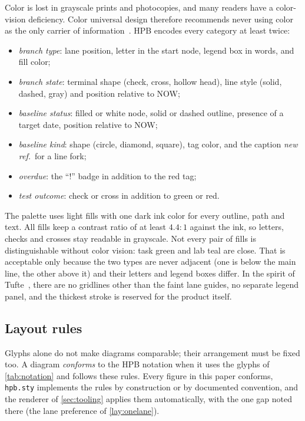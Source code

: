 Color is lost in grayscale prints and photocopies, and many readers have
a color-vision deficiency. Color universal design therefore recommends
never using color as the only carrier of
information~\citep{okabe2008cud}. HPB encodes every category at least
twice:
\begin{itemize}[leftmargin=1.5em,itemsep=1pt,topsep=3pt]
  \item \emph{branch type}: lane position, letter in the start node, legend
        box in words, and fill color;
  \item \emph{branch state}: terminal shape (check, cross, hollow head),
        line style (solid, dashed, gray) and position relative to NOW;
  \item \emph{baseline status}: filled or white node, solid or dashed
        outline, presence of a target date, position relative to NOW;
  \item \emph{baseline kind}: shape (circle, diamond, square), tag color,
        and the caption \emph{new ref.}\ for a line fork;
  \item \emph{overdue}: the ``!'' badge in addition to the red tag;
  \item \emph{test outcome}: check or cross in addition to green or red.
\end{itemize}
The palette uses light fills with one dark ink color for every outline,
path and text. All fills keep a contrast ratio of at least $4.4{:}1$
against the ink, so letters, checks and crosses stay readable in
grayscale. Not every pair of fills is distinguishable without color
vision: task green and lab teal are close. That is acceptable only because
the two types are never adjacent (one is below the main line, the other
above it) and their letters and legend boxes differ. In the spirit of
Tufte~\citep{tufte2001}, there are no gridlines other than the faint lane
guides, no separate legend panel, and the thickest stroke is reserved for
the product itself.

\subsection{Layout rules}
\label{sec:notation-layout}

Glyphs alone do not make diagrams comparable; their arrangement must be
fixed too. A diagram \emph{conforms} to the HPB notation when it uses the
glyphs of \cref{tab:notation} and follows these rules. Every figure in
this paper conforms, \texttt{hpb.sty} implements the rules by construction
or by documented convention, and the renderer of \cref{sec:tooling}
applies them automatically, with the one gap noted there (the lane
preference of \ref{lay:onelane}).

